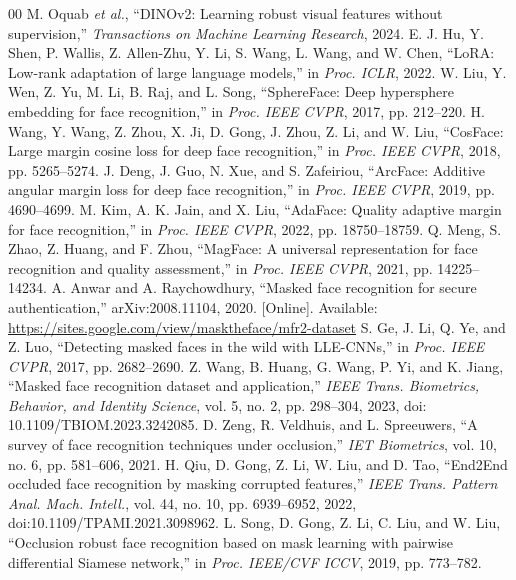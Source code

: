 \documentclass[10pt,journal,compsoc]{IEEEtran}
\begin{document}

\begin{thebibliography}{00}
 M. Oquab \textit{et al.}, ``DINOv2: Learning robust visual features without supervision,'' \textit{Transactions on Machine Learning Research}, 2024.
 E. J. Hu, Y. Shen, P. Wallis, Z. Allen-Zhu, Y. Li, S. Wang, L. Wang, and W. Chen, ``LoRA: Low-rank adaptation of large language models,'' in \textit{Proc. ICLR}, 2022.
 W. Liu, Y. Wen, Z. Yu, M. Li, B. Raj, and L. Song, ``SphereFace: Deep hypersphere embedding for face recognition,'' in \textit{Proc. IEEE CVPR}, 2017, pp. 212--220.
 H. Wang, Y. Wang, Z. Zhou, X. Ji, D. Gong, J. Zhou, Z. Li, and W. Liu, ``CosFace: Large margin cosine loss for deep face recognition,'' in \textit{Proc. IEEE CVPR}, 2018, pp. 5265--5274.
 J. Deng, J. Guo, N. Xue, and S. Zafeiriou, ``ArcFace: Additive angular margin loss for deep face recognition,'' in \textit{Proc. IEEE CVPR}, 2019, pp. 4690--4699.
 M. Kim, A. K. Jain, and X. Liu, ``AdaFace: Quality adaptive margin for face recognition,'' in \textit{Proc. IEEE CVPR}, 2022, pp. 18750--18759.
 Q. Meng, S. Zhao, Z. Huang, and F. Zhou, ``MagFace: A universal representation for face recognition and quality assessment,'' in \textit{Proc. IEEE CVPR}, 2021, pp. 14225--14234.
 A. Anwar and A. Raychowdhury, ``Masked face recognition for secure authentication,'' arXiv:2008.11104, 2020. [Online]. Available: \url{https://sites.google.com/view/masktheface/mfr2-dataset}
 S. Ge, J. Li, Q. Ye, and Z. Luo, ``Detecting masked faces in the wild with LLE-CNNs,'' in \textit{Proc. IEEE CVPR}, 2017, pp. 2682--2690.
 Z. Wang, B. Huang, G. Wang, P. Yi, and K. Jiang, ``Masked face recognition dataset and application,'' \textit{IEEE Trans. Biometrics, Behavior, and Identity Science}, vol. 5, no. 2, pp. 298--304, 2023, doi: 10.1109/TBIOM.2023.3242085.
 D. Zeng, R. Veldhuis, and L. Spreeuwers, ``A survey of face recognition techniques under occlusion,'' \textit{IET Biometrics}, vol. 10, no. 6, pp. 581--606, 2021.
 H. Qiu, D. Gong, Z. Li, W. Liu, and D. Tao, ``End2End occluded face recognition by masking corrupted features,'' \textit{IEEE Trans. Pattern Anal. Mach. Intell.}, vol. 44, no. 10, pp. 6939--6952, 2022, doi:10.1109/TPAMI.2021.3098962.
 L. Song, D. Gong, Z. Li, C. Liu, and W. Liu, ``Occlusion robust face recognition based on mask learning with pairwise differential Siamese network,'' in \textit{Proc. IEEE/CVF ICCV}, 2019, pp. 773--782.

\end{thebibliography}
\end{document}
